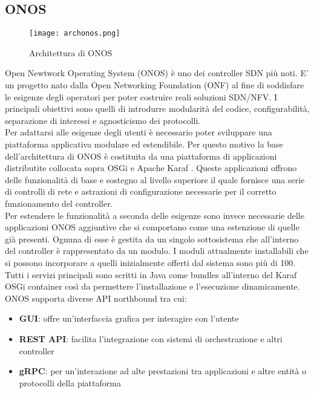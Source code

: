 \subsection{ONOS}
\begin{figure}[h]
    \centering
   \texttt{[image: archonos.png]}
    \caption{Architettura di ONOS}
    \label{fig:img3}
\end{figure}
Open Newtwork Operating System (ONOS) \cite{ONOS} è uno dei controller SDN più noti. 
E' un progetto nato dalla Open Networking Foundation (ONF) \cite{ONF} al fine di soddisfare le esigenze degli operatori per poter costruire reali soluzioni SDN/NFV.
I principali obiettivi sono quelli di introdurre modularità del codice, configurabilità, separazione di interessi e agnosticismo dei protocolli.
\\Per adattarsi alle esigenze degli utenti è necessario poter sviluppare una piattaforma applicativa modulare ed estendibile.
Per questo motivo la base dell'architettura di ONOS è costituita da una piattaforma di applicazioni distributite collocata sopra OSGi \cite{osgi} e Apache Karaf \cite{Apache}. 
Queste applicazioni offrono delle funzionalità di base e sostegno al livello superiore il quale fornisce una serie di controlli di rete e astrazioni di configurazione necessarie per il corretto funzionamento del controller.
\\Per estendere le funzionalità a seconda delle esigenze sono invece necessarie delle applicazioni ONOS aggiuntive che si comportano come una estenzione di quelle già presenti. 
Ognuna di esse è gestita da un singolo sottosistema che all'interno del controller è rappresentato da un modulo.
I moduli attualmente installabili che si possono incorporare a quelli inizialmente offerti dal sistema sono più di 100.
Tutti i servizi principali sono scritti in Java come bundles all'interno del Karaf OSGi container così da permettere l'installazione e l'esecuzione dinamicamente.
\\ONOS supporta diverse API northbound tra cui:
\begin{itemize}
\item \textbf{GUI}: offre un'interfaccia grafica per interagire con l'utente
\item \textbf{REST API}: facilita l'integrazione con sistemi di orchestrazione e altri controller 
\item \textbf{gRPC}: per un'interazione ad alte prestazioni tra applicazioni e altre entità o protocolli della piattaforma
\end{itemize}
